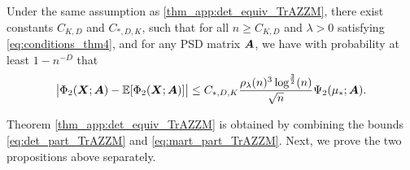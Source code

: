 \begin{proposition} \label{prop:TrAZZM_martingale}
    Under the same assumption as \cref{thm_app:det_equiv_TrAZZM}, there exist constants $C_{K,D}$ and $C_{*,D,K}$, such that for all $n \geq C_{K,D}$ and  $\lambda >0$ satisfying \cref{eq:conditions_thm4}, and for any PSD matrix ${\boldsymbol A}$, we have with probability at least $1 -n^{-D}$ that
    \begin{equation}\label{eq:mart_part_TrAZZM}
         \big\vert \Phi_2({\boldsymbol X};{\boldsymbol A})  - \mathbb{E} [ \Phi_2({\boldsymbol X};{\boldsymbol A}) ]  \big\vert \leq C_{*,D,K} \frac{ \rho_\lambda (n)^{3} \log^{\frac32} (n)}{\sqrt{n}} \Psi_2 (\mu_* ; {\boldsymbol A}) .
    \end{equation}
\end{proposition}

Theorem \ref{thm_app:det_equiv_TrAZZM} is obtained by combining the bounds \eqref{eq:det_part_TrAZZM} and \eqref{eq:mart_part_TrAZZM}. Next, we prove the two propositions above separately.


